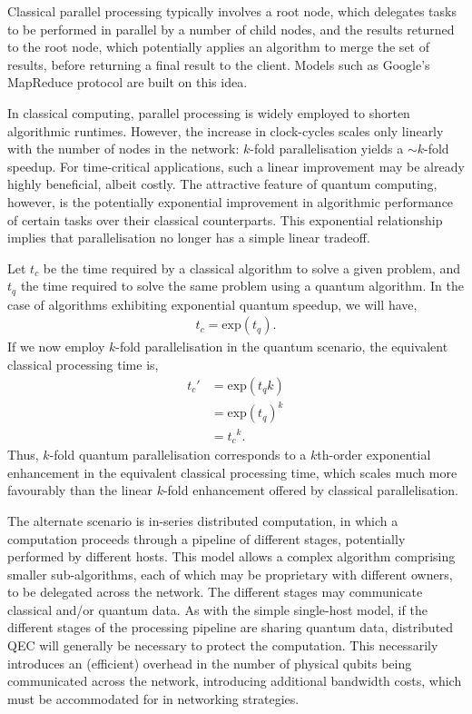 \documentclass[aps,rmp,twocolumn,amsmath,amssymb,nofootinbib,superscriptaddress]{revtex4}
\begin{document}
Classical parallel processing typically involves a root node, which delegates tasks to be performed in parallel by a number of child nodes, and the results returned to the root node, which potentially applies an algorithm to merge the set of results, before returning a final result to the client. Models such as Google's {\sc MapReduce} protocol \cite{bib:MapReduce} are built on this idea.

In classical computing, parallel processing is widely employed to shorten algorithmic runtimes. However, the increase in clock-cycles scales only linearly with the number of nodes in the network: $k$-fold parallelisation yields a \mbox{$\sim k$}-fold speedup. For time-critical applications, such a linear improvement may be already highly beneficial, albeit costly. The attractive feature of quantum computing, however, is the potentially exponential improvement in algorithmic performance of certain tasks over their classical counterparts. This exponential relationship implies that parallelisation no longer has a simple linear tradeoff.

Let $t_c$ be the time required by a classical algorithm to solve a given problem, and $t_q$ the time required to solve the same problem using a quantum algorithm. In the case of algorithms exhibiting exponential quantum speedup, we will have,
\begin{align}
t_c = \mathrm{exp}(t_q).
\end{align}
If we now employ $k$-fold parallelisation in the quantum scenario, the equivalent classical processing time is,
\begin{align}
t_c' &= \mathrm{exp}(t_q k) \nonumber \\
&= \mathrm{exp}(t_q)^{k} \nonumber \\
&= {t_c}^{k}.
\end{align}
Thus, $k$-fold quantum parallelisation corresponds to a $k$th-order exponential enhancement in the equivalent classical processing time, which scales much more favourably than the linear $k$-fold enhancement offered by classical parallelisation.

The alternate scenario is in-series distributed computation, in which a computation proceeds through a pipeline of different stages, potentially performed by different hosts. This model allows a complex algorithm comprising smaller sub-algorithms, each of which may be proprietary with different owners, to be delegated across the network. The different stages may communicate classical and/or quantum data. As with the simple single-host model, if the different stages of the processing pipeline are sharing quantum data, distributed QEC will generally be necessary to protect the computation. This necessarily introduces an (efficient) overhead in the number of physical qubits being communicated across the network, introducing additional bandwidth costs, which must be accommodated for in networking strategies.
\end{document}
